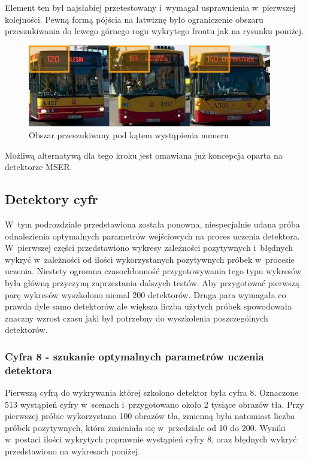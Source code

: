 Element ten był najsłabiej przetestowany i~wymagał usprawnienia 
w~pierwszej kolejności. Pewną formą pójścia na łatwiznę było
ograniczenie obszaru przeszukiwania do lewego górnego rogu wykrytego
frontu jak na rysunku poniżej.

\begin{figure}[!h]
    \centering
    \includegraphics[width=0.95\textwidth]{img/exp_front_upper_left}
    \caption{Obszar przeszukiwany pod kątem wystąpienia numeru}
    \label{fig:frontupperleft}
\end{figure}

Możliwą alternatywą dla tego kroku jest omawiana już koncepcja
oparta na detektorze MSER.

\subsection{Detektory cyfr}

W~tym podrozdziale przedstawiona została ponowna,
niespecjalnie udana próba odnalezienia optymalnych
parametrów wejściowych na proces uczenia detektora.
W~pierwszej części przedstawiono wykresy zależności pozytywnych
i~błędnych wykryć w~zależności od ilości wykorzystanych
pozytywnych próbek w~procesie uczenia. Niestety
ogromna czasochłonność przygotowywania tego typu wykresów
była główną przyczyną zaprzestania dalszych testów.
Aby przygotować pierwszą parę wykresów wyszkolono niemal 200 detektorów.
Druga para wymagała co prawda dyle samo detektorów ale większa 
liczba użytych próbek spowodowała znaczny wzrost czasu jaki był 
potrzebny do wyszkolenia poszczególnych detektorów.

\subsubsection{Cyfra 8 - szukanie optymalnych parametrów uczenia detektora}

Pierwszą cyfrą do wykrywania której szkolono detektor była cyfra 8.
Oznaczone 513 wystąpień cyfry w~scenach i~przygotowano około 2 tysiące
obrazów tła. Przy pierwszej próbie wykorzystano 100 obrazów tła, zmienną
była natomiast liczba próbek pozytywnych, która zmieniała się w~przedziale
od 10 do 200. Wyniki w~postaci ilości wykrytych poprawnie wystąpień cyfry
8, oraz błędnych wykryć przedstawiono na wykresach poniżej.

